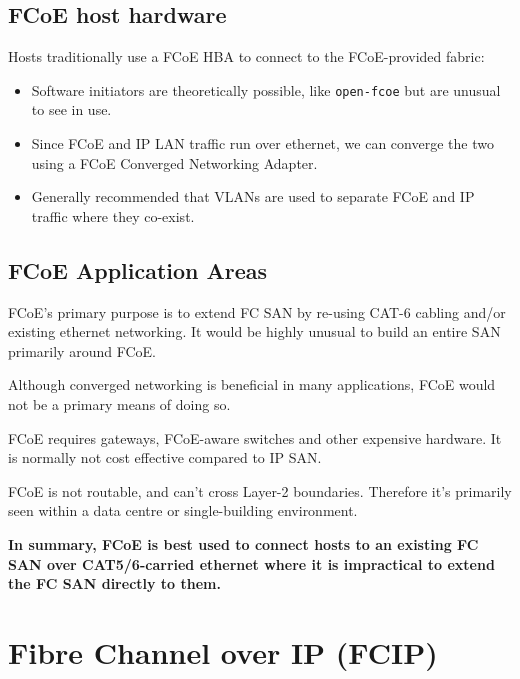 \documentclass[slides]{pgnotes}
\begin{document}


\subsection{FCoE host hardware}
\label{sec:fcoe-host-hardware}

Hosts traditionally use a FCoE HBA to connect to the FCoE-provided
fabric:
\begin{itemize}
\item Software initiators are theoretically possible, like \texttt{open-fcoe} but are unusual to see in use.
\item Since FCoE and IP LAN traffic run over ethernet, we can converge the two using a FCoE Converged Networking Adapter.
\item Generally recommended that VLANs are used to separate FCoE and IP traffic where they co-exist.
\end{itemize}
  


\subsection{FCoE Application Areas}
\label{sec:fcoe-application-areas}

FCoE's primary purpose is to extend FC SAN by re-using CAT-6 cabling
and/or existing ethernet networking. It would be highly unusual to build
an entire SAN primarily around FCoE.

Although converged networking is beneficial in many applications, FCoE
would not be a primary means of doing so.

FCoE requires gateways, FCoE-aware switches and other expensive
hardware. It is normally not cost effective compared to IP SAN.

FCoE is not routable, and can't cross Layer-2 boundaries. Therefore it's
primarily seen within a data centre or single-building environment.

\textbf{In summary, FCoE is best used to connect hosts to an existing FC
SAN over CAT5/6-carried ethernet where it is impractical to extend the
FC SAN directly to them.}

\section{Fibre Channel over IP (FCIP)}
\label{sec:fibre-channel-over-ip}
\end{document}
